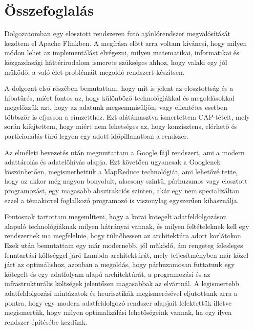 \documentclass[a4paper,12pt]{article}
\begin{document}
\newpage
\section{Összefoglalás}
Dolgozatomban egy elosztott rendszeren futó ajánlórendszer megvalósítását kezdtem el Apache Flinkben. A megírása előtt arra voltam kíváncsi, hogy milyen módon lehet az implementálást elvégezni, milyen matematikai, informatikai és közgazdasági háttérirodalom ismerete szükséges ahhoz, hogy valaki egy jól működő, a való élet problémáit megoldó rendszert készítsen. 	

A dolgozat első részében bemutattam, hogy mit is jelent az elosztottság és a 
hibatűrés, miért fontos az, hogy különböző technológiákkal és megoldásokkal megelőzzük azt, hogy az adatunk megsemmisüljön, vagy ellentétes esetben többször is eljusson a címzetthez. Ezt alátámasztva ismertettem CAP-tételt,  mely során kifejtettem, hogy miért nem lehetséges az, hogy konzisztens, elérhető és particionálás-tűrő legyen egy adott időpillanatban a rendszer.

Az elméleti bevezetés után megmutattam a Google fájl rendszert, ami a modern adattárolás és adatelőhívás alapja.
Ezt követően ugyancsak a Googlenek köszönhetően, megismerhettük a MapReduce technológiát, ami lehetővé tette, hogy az akkor még nagyon bonyolult, alacsony szintű, párhuzamos vagy elosztott programozást, egy magasabb absztrakciós szinten, akár egy nem specializáltan ezzel a témakörrel foglalkozó programozó is viszonylag egyszerűen kihasználja.

Fontosnak tartottam megemlíteni, hogy a korai kötegelt adatfeldolgozáson alapuló technológiáknak milyen hátrányai vannak, és milyen feltételeknek kell egy rendszernek ma megfelelnie, hogy túlnőhessen az architektúra adott korlátokon. Ezek után bemutattam egy már modernebb, jól működő, ám rengeteg felesleges fenntartási költséggel járó Lambda-architektúrát, mely teljesítményben már közel járt az optimálishoz, azonban a megoldás, hogy párhuzamosan futtatunk egy kötegelt és egy adatfolyam alapú architektúrát, a programozási és az infrastrukturális költségek jelentősen magasabbak az elvártnál. A legismertebb adatfeldolgozási mintázatok és heurisztikák megismerésével eljutottunk arra a pontra, hogy egy modern adatfeldolgozó rendszer alapjait lefektettük illetve megismertük, hogy milyen optimalizálási lehetőségeink vannak, ha egy ilyen rendszer építésébe kezdünk.
\end{document}

